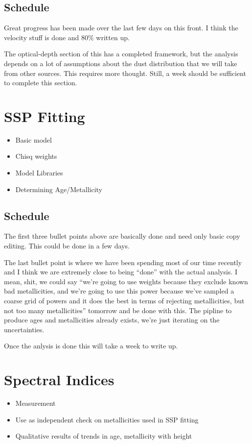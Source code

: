 \subsection{Schedule}
Great progress has been made over the last few days on this front. I think the
velocity stuff is done and 80\% written up.

The optical-depth section of this has a completed framework, but the analysis
depends on a lot of assumptions about the dust distribution that we will take
from other sources. This requires more thought. Still, a week should be
sufficient to complete this section.

\section{SSP Fitting}
\begin{itemize}
  \item Basic model
  \item Chisq weights
  \item Model Libraries
  \item Determining Age/Metallicity
\end{itemize}
\subsection{Schedule}
The first three bullet points above are basically done and need only basic
copy editing. This could be done in a few days.

The last bullet point is where we have been spending most of our time recently
and I think we are extremely close to being ``done'' with the actual
analysis. I mean, shit, we could say ``we're going to use weights because they
exclude known bad metallicities, and we're going to use this power because
we've sampled a coarse grid of powers and it does the best in terms of
rejecting metallicities, but not too many metallicities'' tomorrow and be done
with this. The pipline to produce ages and metallicities already exists, we're
just iterating on the uncertainties.

Once the anlysis is done this will take a week to write up.

\section{Spectral Indices}
\begin{itemize}
  \item Measurement
  \item Use as independent check on metallicities used in SSP fitting
  \item Qualitative results of trends in age, metallicity with height
\end{itemize}
